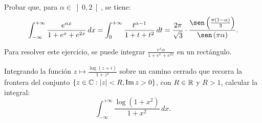 \begin{ejercicio}
    Probar que, para $\alpha \in \left]0, 2\right[$, se tiene:
    \begin{equation*}
        \int_{-\infty}^{+\infty} \frac{e^{\alpha x}}{1 + e^x + e^{2x}} \, dx = \int_0^{+\infty} \frac{t^{\alpha - 1}}{1 + t + t^2} \, dt = \dfrac{2\pi}{\sqrt{3}}\cdot \dfrac{\sen\left(\frac{\pi(1 - \alpha)}{3}\right)}{\sen\left(\pi \alpha\right)}.
    \end{equation*}
    \begin{observacion}
        Para resolver este ejercicio, se puede integrar $\frac{e^x \alpha}{1 + e^x + e^{2x}}$ en un rectángulo.
    \end{observacion}
\end{ejercicio}

\begin{ejercicio}
    Integrando la función $z \mapsto \frac{\log(z + i)}{1 + z^2}$ sobre un camino cerrado que recorra la frontera del conjunto $\{z \in \mathbb{C} : |z| < R, \operatorname{Im} z > 0\}$, con $R \in \mathbb{R}$ y $R > 1$, calcular la integral:
    \begin{equation*}
        \int_{-\infty}^{+\infty} \frac{\log(1 + x^2)}{1 + x^2} \, dx.
    \end{equation*}
\end{ejercicio}

